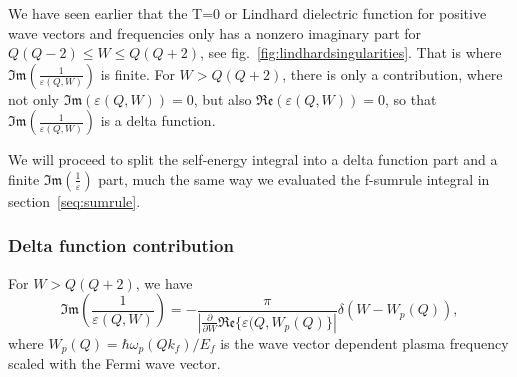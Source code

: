 \documentclass[physics,phd,nolot,nolof]{uccthesis}%
\begin{document}
{We have seen earlier that the T=0 or Lindhard dielectric function for positive
wave vectors and frequencies only has a nonzero imaginary part for
$Q(Q-2)\leq W\leq Q(Q+2) $, see fig.~\ref{fig:lindhardsingularities}.
That is where $\mathfrak{Im}(\frac{1}{\varepsilon(Q,W)})$ is finite.
For $W > Q(Q+2)$, there is only a contribution, where 
not only $\mathfrak{Im}(\varepsilon(Q,W))=0$, but also 
$\mathfrak{Re}(\varepsilon(Q,W))=0$, so that
$\mathfrak{Im}(\frac{1}{\varepsilon(Q,W)})$ is a delta function.

We will proceed to split the self-energy integral into a delta function part
and a finite $\mathfrak{Im}(\frac{1}{\varepsilon})$ part, much the same way 
we evaluated the f-sumrule integral in section~\ref{seq:sumrule}.
\subsubsection{Delta function contribution}
For $W > Q(Q+2)$, we have 
$$\mathfrak{Im}(\frac{1}{\varepsilon(Q,W)})= 
-\frac{\pi}{|\frac{\partial}{\partial W} \mathfrak{Re}\{\varepsilon(Q,W_p(Q)\}|}
\delta(W-W_p(Q)),$$
where $W_p(Q) = \hbar\omega_p(Q k_f)/E_f$ is the wave vector dependent plasma 
frequency scaled with the Fermi wave vector.

}
\end{document}
